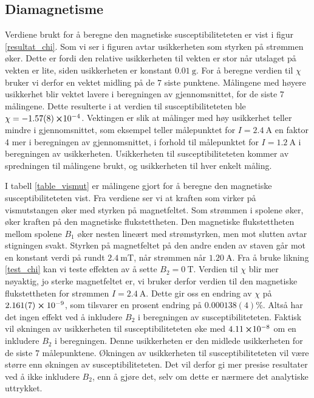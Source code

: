 \documentclass[%
 reprint,
 amsmath,amssymb,
 aps,
 norsk,
]{revtex4-1}
\begin{document}
\subsection{Diamagnetisme}
Verdiene brukt for å beregne den magnetiske susceptibiliteteten er vist i figur \vref{resultat_chi}. Som vi ser i figuren avtar usikkerheten som styrken på strømmen øker. Dette er fordi den relative usikkerheten til vekten er stor når utslaget på vekten er lite, siden usikkerheten er konstant $\SI{0.01}{\gram}$. For å beregne verdien til $\chi$ bruker vi derfor en vektet midling på de $7$ siste punktene. Målingene med høyere usikkerhet blir vektet lavere i beregningen av gjennomsnittet, for de siste $7$ målingene. Dette resulterte i at verdien til susceptibiliteteten ble $\chi = -\SI{1.57\pm0.08}\cross 10^{-4}$. Vektingen er slik at målinger med høy usikkerhet teller mindre i gjennomsnittet, som eksempel teller målepunktet for $I=\SI{2.4}{\ampere}$ en faktor 4 mer i beregningen av gjennomsnittet, i forhold til målepunktet for $I=\SI{1.2}{\ampere}$ i beregningen av usikkerheten. Usikkerheten til susceptibiliteteten kommer av spredningen til målingene brukt, og usikkerheten til hver enkelt måling.\par
I tabell \vref{table_vismut} er målingene gjort for å beregne den magnetiske susceptibiliteteten vist. Fra verdiene ser vi at kraften som virker på vismutstangen øker med styrken på magnetfeltet. Som strømmen i spolene øker, øker kraften på den magnetiske flukstettheten. Den magnetiske flukstettheten mellom spolene $B_1$ øker nesten lineært med strømstyrken, men mot slutten avtar stigningen svakt. Styrken på magnetfeltet på den andre enden av staven går mot en konstant verdi på rundt $\SI{2.4}{\milli\tesla}$, når strømmen når $\SI{1.20}{\ampere}$. Fra å bruke likning \eqref{test_chi} kan vi teste effekten av å sette $B_2=\SI{0}{\tesla}$. Verdien til $\chi$ blir mer nøyaktig, jo sterke magnetfeltet er, vi bruker derfor verdien til den magnetiske flukstettheten for strømmen $I=\SI{2.4}{\ampere}$. Dette gir oss en endring av $\chi$
på $2.161(7)\cross10^{-9}$, som tilsvarer en prosent endring på $0.000138(4)\%$. Altså har det ingen effekt ved å inkludere $B_2$ i beregningen av susceptibiliteteten. Faktisk vil økningen av usikkerheten til susceptibiliteteten øke med $\SI{4.11}\cross 10^{-8}$ om en inkludere $B_2$ i beregningen. Denne usikkerheten er den midlede usikkerheten for de siste $7$ målepunktene. Økningen av usikkerheten til susceptibiliteteten vil være større enn økningen av susceptibiliteteten. Det vil derfor gi mer presise resultater ved å ikke inkludere $B_2$, enn å gjøre det, selv om dette er nærmere det analytiske uttrykket. \\
\end{document}
